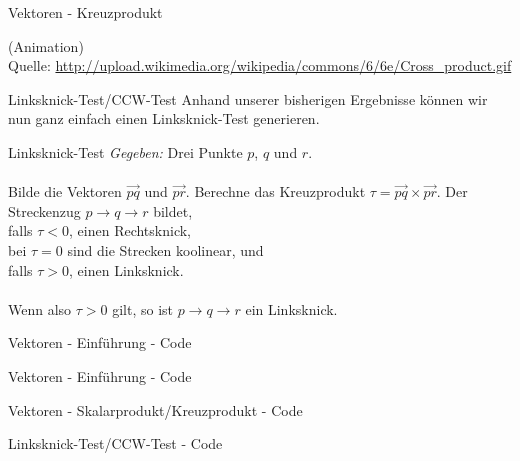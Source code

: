 \begin{frame}{Vektoren - Kreuzprodukt}
	\begin{center}
		(Animation)\\
		Quelle:	\url{http://upload.wikimedia.org/wikipedia/commons/6/6e/Cross_product.gif}
	\end{center}
\end{frame}

\begin{frame}{Linksknick-Test/CCW-Test}
	Anhand unserer bisherigen Ergebnisse können wir nun ganz einfach einen Linksknick-Test generieren.
	
	\begin{block}{Linksknick-Test}
		\textit{Gegeben:} Drei Punkte $p$, $q$ und $r$.\\ \ \\
		
		Bilde die Vektoren $\overrightarrow{pq}$ und $\overrightarrow{pr}$. Berechne das Kreuzprodukt $\tau = \overrightarrow{pq} \times \overrightarrow{pr}$. Der Streckenzug $p \rightarrow q \rightarrow r$ bildet,\\
		falls $\tau < 0$, einen Rechtsknick,\\
		bei $\tau = 0$ sind die Strecken koolinear, und\\
		falls $\tau > 0$, einen Linksknick.\\ \ \\
		
		Wenn also $\tau > 0$ gilt, so ist $p \rightarrow q \rightarrow r$ ein Linksknick.
	\end{block}
\end{frame}

\begin{frame}{Vektoren - Einführung - Code}
	\lstset{
		language=C++,
		tabsize=1
	}
	
\end{frame}

\begin{frame}{Vektoren - Einführung - Code}
	\lstset{
		language=C++,
		tabsize=1
	}
	
\end{frame}

\begin{frame}{Vektoren - Skalarprodukt/Kreuzprodukt - Code}
	\lstset{
		language=C++,
		tabsize=1
	}
	
\end{frame}

\begin{frame}{Linksknick-Test/CCW-Test - Code}
	\lstset{
		language=C++,
		tabsize=1
	}
	
\end{frame}
